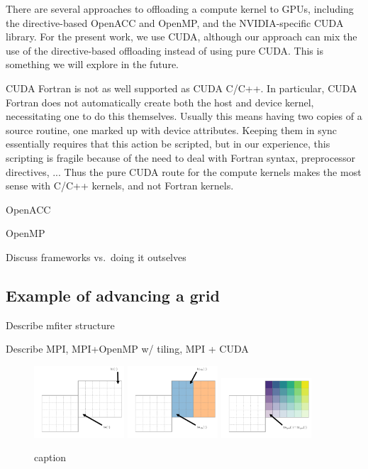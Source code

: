\documentclass[twocolumn,times]{aastex62}
\begin{document}
There are several approaches to offloading a compute kernel to GPUs,
including the directive-based OpenACC and OpenMP, and the
NVIDIA-specific CUDA library.  For the present work, we use CUDA,
although our approach can mix the use of the directive-based
offloading instead of using pure CUDA.  This is something we will
explore in the future.  

CUDA Fortran is not as well supported as CUDA C/C++.  In particular,
CUDA Fortran does not automatically create both the host and device
kernel, necessitating one to do this themselves.  Usually this means
having two copies of a source routine, one marked up with device
attributes.  Keeping them in sync essentially requires that this
action be scripted, but in our experience, this scripting is fragile
because of the need to deal with Fortran syntax, preprocessor
directives, ...  Thus the pure CUDA route for the compute kernels makes the most sense
with C/C++ kernels, and not Fortran kernels.

OpenACC


OpenMP

Discuss frameworks vs.\ doing it outselves




\subsection{Example of advancing a grid}

Describe mfiter structure

Describe MPI, MPI+OpenMP w/ tiling, MPI + CUDA

\begin{figure}
\centering
\includegraphics[width=0.3\textwidth]{gpu_1}
\includegraphics[width=0.3\textwidth]{gpu_2}
\includegraphics[width=0.3\textwidth]{gpu_3}
\caption{\label{fig:loops} caption}
\end{figure}
\end{document}
